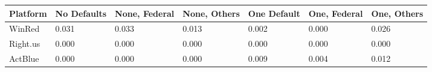 \begin{tabularx}{.85\textwidth}{lXXXXXX}
  \toprule
Platform & No \newline Defaults & None, \newline Federal & None, \newline Others & One \newline Default & One, \newline Federal & One, \newline Others \\ 
  \midrule
WinRed & 0.031 & 0.033 & 0.013 & 0.002 & 0.000 & 0.026 \\ 
  Right.us & 0.000 & 0.000 & 0.000 & 0.000 & 0.000 & 0.000 \\ 
  ActBlue & 0.000 & 0.000 & 0.000 & 0.009 & 0.004 & 0.012 \\ 
   \bottomrule
\end{tabularx}
